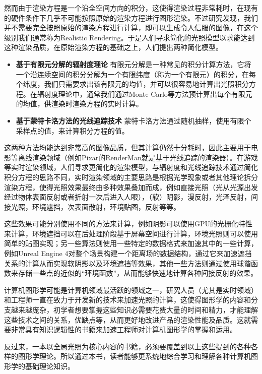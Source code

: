 然而由于渲染方程是一个沿全空间方向的积分，这使得渲染过程非常耗时，在现有的硬件条件下几乎不可能按照原始的渲染方程进行图形渲染。不过研究发现，我们并不需要完全按照原始的渲染方程进行计算，即可以生成令人信服的图像，在这个级别我们通常称为Realistic Rendering。于是人们寻求简化的光照模型以求能达到这种渲染品质，在原始渲染方程的基础之上，人们提出两种简化模型。

\begin{itemize}
	\item \textbf{基于有限元分解的辐射度理论 } 有限元分解是一种常见的积分计算方法，它将一个沿连续空间的积分分解为一个有限纬度（称为一个有限元）的积分，在每个纬度，我们只需要求出该有限元的均值，并可以很容易地计算出光照积分方程。在辐射度理论中，通常我们通过Monte Carlo等方法预计算出每个有限元的均值，供渲染时渲染方程的实时计算。
	\item \textbf{基于蒙特卡洛方法的光线追踪技术 } 蒙特卡洛方法通过随机抽样，使用有限个采样点的值，来计算积分方程的值。
\end{itemize}

这两种方法均能达到非常高的图像品质，但其计算仍然十分耗时，因此主要用于电影等离线渲染领域（例如Pixar的RenderMan就是基于光线追踪的渲染器）。在游戏等实时渲染领域，人们寻求更简化的渲染模型，与辐射度和光线追踪技术通过简化积分方程的思路不同，实时渲染领域的主要思路是根据光学现象或者其他理论拆分渲染方程，使得光照效果最终由多种效果叠加而成，例如直接光照（光从光源出发经过物体表面反射或者折射一次后进入人眼），（软）阴影，漫反射，光泽反射，间接光照，环境遮挡，次表面散射，环境贴图，反射等等。

这些效果可能分别使用不同的方法来计算，例如阴影可以使用GPU的光栅化特性来计算，环境遮挡可以在后处理阶段基于屏幕空间进行计算，环境光照则可以使用简单的贴图实现；另一些算法则使用一些特定的数据格式来加速其中的一些计算，例如Unreal Engine 4对整个场景构建一个距离场的数据结构，通过它来加速遮挡关系的计算从而实现软阴影以及环境遮挡等效果，其他一些方法则通过使用球谐函数来存储一些点的近似的“环境函数”，从而能够快速地计算各种间接反射的效果。

计算机图形学可能是计算机领域最活跃的领域之一，研究人员（尤其是实时领域）和工程师一直在致力于开发新的技术来加速光照的计算，这使得图形学的内容和分支越来越庞杂，初学者想要掌握这些知识必需要花费大量的时间和精力，才能理解这些技术之间的关系，优缺点等，从而更好地改进产品的渲染性能及品质。这就需要非常具有知识逻辑性的书籍来加速工程师对计算机图形学的掌握和运用。

反过来，一本以全局光照为核心内容的书籍，必须要覆盖到以上这些提到的各种各样的图形学理论。所以通过本书，读者能够更系统地综合学习和理解各种计算机图形学的基础理论知识。



